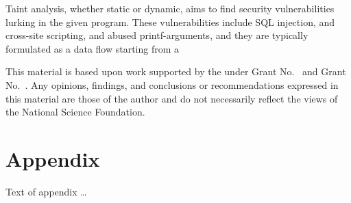 \documentclass[acmsmall,review,anonymous]{acmart}\settopmatter{printfolios=true,printccs=false,printacmref=false}
\begin{document}

Taint analysis, whether static or dynamic, aims to find security vulnerabilities lurking
in the given program. These vulnerabilities include SQL injection, and cross-site
scripting, and abused printf-arguments, and they are typically formulated as a
data flow starting from a 



\begin{acks}                            %
  This material is based upon work supported by the
   under Grant
  No.~ and Grant
  No.~.  Any opinions, findings, and
  conclusions or recommendations expressed in this material are those
  of the author and do not necessarily reflect the views of the
  National Science Foundation.
\end{acks}


% 


\appendix
\section{Appendix}

Text of appendix \ldots
\end{document}
